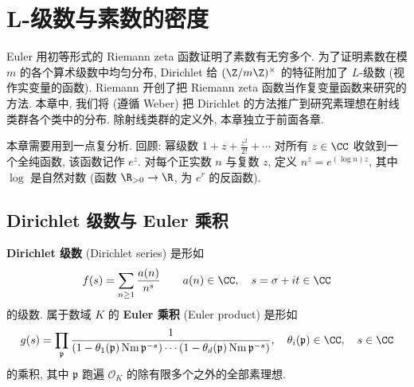 \chapter{L-级数与素数的密度}\label{ch:VI}

Euler 用初等形式的 Riemann zeta 函数证明了素数有无穷多个. 为了证明素数在模 $m$ 的各个算术级数中均匀分布, Dirichlet 给 $(\Z/m\Z)^{\times}$ 的特征附加了 $L$-级数 (视作实变量的函数). Riemann 开创了把 Riemann zeta 函数当作复变量函数来研究的方法. 本章中, 我们将 (遵循 Weber) 把 Dirichlet 的方法推广到研究素理想在射线类群各个类中的分布. 除射线类群的定义外, 本章独立于前面各章.

本章需要用到一点复分析. 回顾: 幂级数 $1+z+\frac{z^2}{2!}+\cdots$ 对所有 $z\in\CC$ 收敛到一个全纯函数, 该函数记作 $e^z$. 对每个正实数 $n$ 与复数 $z$, 定义 $n^z=e^{(\log n)z}$, 其中 $\log$ 是自然对数 (函数 $\R_{>0}\to\R$, 为 $e^r$ 的反函数).

\section{Dirichlet 级数与 Euler 乘积}\label{sec:VI.1}

\textbf{Dirichlet 级数} (Dirichlet series) 是形如
\[
f(s)=\sum_{n\ge1}\frac{a(n)}{n^{s}}\qquad a(n)\in\CC,\quad s=\sigma+it\in\CC
\]
的级数. 属于数域 $K$ 的 \textbf{Euler 乘积} (Euler product) 是形如
\[
g(s)=\prod_{\mathfrak{p}}\frac{1}{(1-\theta_{1}(\mathfrak{p})\Nm\mathfrak{p}^{-s})\cdots(1-\theta_{d}(\mathfrak{p})\Nm\mathfrak{p}^{-s})},\quad\theta_{i}(\mathfrak{p})\in\CC,\quad s\in\CC
\]
的乘积, 其中 $\mathfrak{p}$ 跑遍 $\mathcal{O}_K$ 的除有限多个之外的全部素理想.

